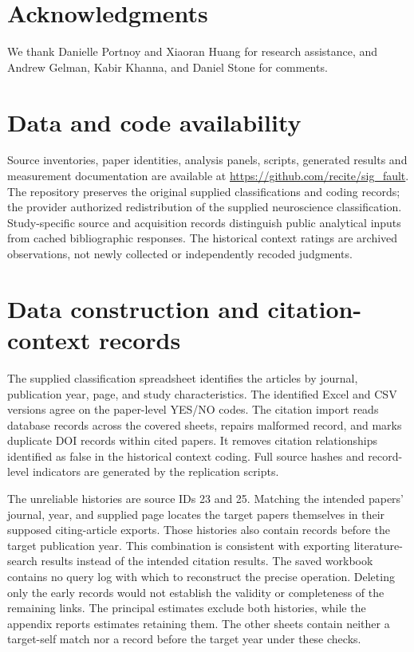 \documentclass[11pt,letterpaper]{article}
\begin{document}
\section*{Acknowledgments}
We thank Danielle Portnoy and Xiaoran Huang for research assistance, and Andrew Gelman, Kabir Khanna, and Daniel Stone for comments.

\section*{Data and code availability}
Source inventories, paper identities, analysis panels, scripts, generated results and measurement documentation are available at \url{https://github.com/recite/sig_fault}. The repository preserves the original supplied classifications and coding records; the provider authorized redistribution of the supplied neuroscience classification. Study-specific source and acquisition records distinguish public analytical inputs from cached bibliographic responses. The historical context ratings are archived observations, not newly collected or independently recoded judgments.




\clearpage
\appendix
{}
\renewcommand{\thetable}{\thesection\arabic{table}}
\renewcommand{\thefigure}{\thesection\arabic{figure}}
\renewcommand{\theHtable}{appendix.\thesection.\arabic{table}}
\renewcommand{\theHfigure}{appendix.\thesection.\arabic{figure}}
\section{Data construction and citation-context records}\label{app:data}
The supplied classification spreadsheet identifies the articles by journal, publication year, page, and study characteristics. The identified Excel and CSV versions agree on the paper-level YES/NO codes. The citation import reads \Records{} database records across the covered sheets, repairs \Repaired{} malformed record, and marks \Duplicates{} duplicate DOI records within cited papers. It removes \FalseLinks{} citation relationships identified as false in the historical context coding. Full source hashes and record-level indicators are generated by the replication scripts.

The unreliable histories are source IDs 23 and 25. Matching the intended papers' journal, year, and supplied page locates the target papers themselves in their supposed citing-article exports. Those histories also contain \Prepublication{} records before the target publication year. This combination is consistent with exporting literature-search results instead of the intended citation results. The saved workbook contains no query log with which to reconstruct the precise operation. Deleting only the early records would not establish the validity or completeness of the remaining links. The principal estimates exclude both histories, while the appendix reports estimates retaining them. The other sheets contain neither a target-self match nor a record before the target year under these checks.
\end{document}
